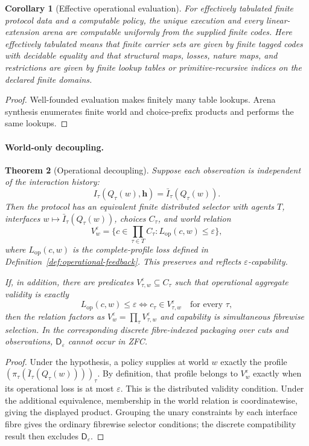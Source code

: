 \documentclass[11pt]{article}
\theoremstyle{plain}
\newtheorem{theorem}{Theorem}[section]
\newtheorem{corollary}[theorem]{Corollary}
\theoremstyle{definition}
\theoremstyle{remark}
\newcommand{\eps}{\varepsilon}
\begin{document}
\begin{corollary}[Effective operational evaluation]
\label{cor:effective-operational}
For effectively tabulated finite protocol data and a computable policy, the
unique execution and every linear-extension arena are computable uniformly from
the supplied finite codes. Here effectively tabulated means that finite carrier
sets are given by finite tagged codes with decidable equality and that structural
maps, losses, nature maps, and restrictions are given by finite lookup tables or
primitive-recursive indices on the declared finite domains.
\end{corollary}

\begin{proof}
Well-founded evaluation makes finitely many table lookups. Arena synthesis
enumerates finite world and choice-prefix products and performs the same
lookups.
\end{proof}

\paragraph{World-only decoupling.}

\begin{theorem}[Operational decoupling]
\label{thm:operational-decoupling}
Suppose each observation is independent of the interaction history:
\[
I_\tau(Q_\tau(w),\mathbf h)=\bar I_\tau(Q_\tau(w)).
\]
Then the protocol has an equivalent finite distributed selector with agents
$T$, interfaces $w\mapsto\bar I_\tau(Q_\tau(w))$, choices $C_\tau$, and
world relation
\[
V_w^\eps=
\{c\in\prod_{\tau\in T}C_\tau:
L_{\mathrm{op}}(c,w)\le\eps\},
\]
where $L_{\mathrm{op}}(c,w)$ is the complete-profile loss defined in
Definition~\ref{def:operational-feedback}. This preserves and reflects
$\eps$-capability.

If, in addition, there are predicates
$V_{\tau,w}^\eps\subseteq C_\tau$ such that operational aggregate validity is
exactly
\[
L_{\mathrm{op}}(c,w)\le\eps
\iff
c_\tau\in V_{\tau,w}^\eps\quad\text{for every }\tau,
\]
then the relation factors as $V_w^\eps=\prod_\tau V_{\tau,w}^\eps$ and
capability is simultaneous fibrewise selection. In the corresponding discrete fibre-indexed packaging over cuts and
observations, $\mathsf D_\eps$ cannot occur in ZFC.
\end{theorem}

\begin{proof}
Under the hypothesis, a policy supplies at world $w$ exactly the profile
$(\pi_\tau(\bar I_\tau(Q_\tau(w))))_\tau$. By definition, that profile belongs
to $V_w^\eps$ exactly when its operational loss is at most $\eps$. This is the
distributed validity condition. Under the additional equivalence, membership in
the world relation is coordinatewise, giving the displayed product. Grouping
the unary constraints by each interface fibre gives the ordinary fibrewise
selector conditions; the discrete compatibility result then excludes
$\mathsf D_\eps$.
\end{proof}
\end{document}
